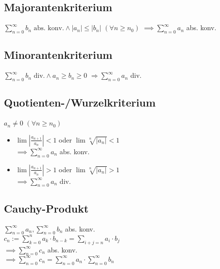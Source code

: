 \subsection*{Majorantenkriterium}
$\displaystyle \sum_{n=0}^\infty b_n \text{ abs. konv.} \land |a_n|\le|b_n|$ $(\forall n\ge n_0)$
$\displaystyle \implies \sum_{n=0}^\infty a_n$ abs. konv.

\subsection*{Minorantenkriterium}
$\displaystyle \sum_{n=0}^\infty b_n \text{ div.} \land a_n\ge b_n\ge0$
$\displaystyle \Rightarrow \sum_{n=0}^\infty a_n$ div.

\subsection*{Quotienten-/Wurzelkriterium}
$a_n \neq 0$ $(\forall n\ge n_0)$
\begin{itemize}
	\item $\displaystyle \lim\left|\frac{a_{n+1}}{a_n}\right|<1$ oder $\displaystyle \lim\sqrt[n]{|a_n|}<1$\\
		$\displaystyle \implies \sum_{n=0}^\infty a_n$ abs. konv.
	\item $\displaystyle \lim\left|\frac{a_{n+1}}{a_n}\right|>1$ oder $\displaystyle \lim\sqrt[n]{|a_n|}>1$\\
		$\displaystyle \implies \sum_{n=0}^\infty a_n$ div.
\end{itemize}

\subsection*{Cauchy-Produkt}
$\displaystyle \sum_{n=0}^\infty a_n, \sum_{n=0}^\infty b_n$ abs. konv. \\
$\displaystyle c_n := \sum_{k=0}^n a_k\cdot b_{n-k}= \sum_{i+j=n}a_i\cdot b_j$ \\
$\displaystyle \implies \sum_{n=0}^\infty c_n$ abs. konv. \\
$\displaystyle \implies \sum_{n=0}^\infty c_n=\sum_{n=0}^\infty a_n \cdot \sum_{n=0}^\infty b_n$
